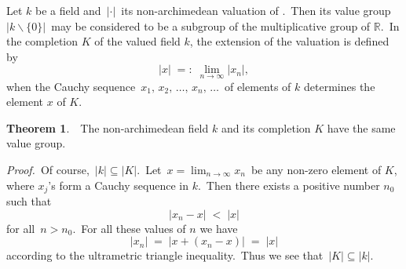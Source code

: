 \documentclass[12pt]{article}
\theoremstyle{definition}
\newtheorem*{thmplain}{Theorem}
\begin{document}
Let $k$ be a field and\, $|\cdot|$\, its non-archimedean valuation of .\, Then its value group\, $|k\!\smallsetminus\!\{0\}|$\, may be considered to be a subgroup of the multiplicative group of $\mathbb{R}$.\, In the completion $K$ of the valued field $k$, the extension of the valuation is defined by
             $$|x| \;=:\; \lim_{n\to\infty}|x_n|,$$
when the Cauchy sequence \,$x_1,\,x_2,\,\ldots,\,x_n,\,\ldots$\, of elements of $k$ determines the element $x$ of $K$.

\begin{thmplain}
\, \,The non-archimedean field $k$ and its completion $K$ have the same value group.
\end{thmplain}

{\em Proof.} \,Of course,\, $|k| \subseteq |K|$.\, Let\, 
$x = \lim_{n\to\infty}x_n$\, be any non-zero element of $K$, where $x_j$'s form a Cauchy sequence in $k$.\, Then there exists a positive number $n_0$ such that
           $$|x_n\!-\!x| \;<\; |x|$$
for all\, $n > n_0$.\, For all these values of $n$ we have
       $$|x_n| \;=\; |x\!+\!(x_n\!-\!x)| \;=\; |x|$$
according to the ultrametric triangle inequality.\, Thus we see that\, 
$|K|\subseteq |k|$.
\end{document}
